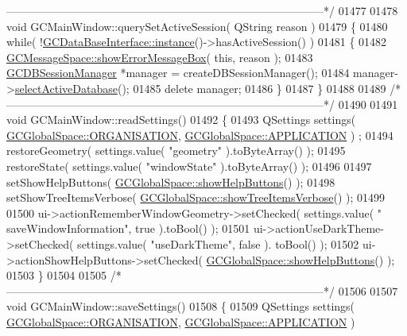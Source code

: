 \begin{DoxyCode}
{{{{{{{{      --------------------------------------------------------------------------------------*/}
01477 
01478 \textcolor{keywordtype}{void} GCMainWindow::querySetActiveSession( QString reason )
01479 \{
01480   \textcolor{keywordflow}{while}( !\hyperlink{class_g_c_data_base_interface_a1baea9c0667aa8b610ec30076fcab84c}{GCDataBaseInterface::instance}()->hasActiveSession() )
01481   \{
01482     \hyperlink{namespace_g_c_message_space_ab118b3a133686167617eb955029fd44e}{GCMessageSpace::showErrorMessageBox}( \textcolor{keyword}{this}, reason );
01483     \hyperlink{class_g_c_d_b_session_manager}{GCDBSessionManager} *manager = createDBSessionManager();
01484     manager->\hyperlink{class_g_c_d_b_session_manager_ac4e5a25619ee77bc9307d3428bfd345d}{selectActiveDatabase}();
01485     \textcolor{keyword}{delete} manager;
01486   \}
01487 \}
01488 
01489 \textcolor{comment}{/*
      --------------------------------------------------------------------------------------*/}
01490 
01491 \textcolor{keywordtype}{void} GCMainWindow::readSettings()
01492 \{
01493   QSettings settings( \hyperlink{namespace_g_c_global_space_a97583835f9987b1c94ff05802ccfe42f}{GCGlobalSpace::ORGANISATION}, \hyperlink{namespace_g_c_global_space_ab53b9c3447f00f1cc45a1d3fdfbba564}{GCGlobalSpace::APPLICATION} )
      ;
01494   restoreGeometry( settings.value( \textcolor{stringliteral}{"geometry"} ).toByteArray() );
01495   restoreState( settings.value( \textcolor{stringliteral}{"windowState"} ).toByteArray() );
01496 
01497   setShowHelpButtons( \hyperlink{namespace_g_c_global_space_a981753e55f0f77f981f67ccb1ad4ecf1}{GCGlobalSpace::showHelpButtons}() );
01498   setShowTreeItemsVerbose( \hyperlink{namespace_g_c_global_space_ad9a35f311bda4dd28f5cf155c5efc818}{GCGlobalSpace::showTreeItemsVerbose}() );
01499 
01500   ui->actionRememberWindowGeometry->setChecked( settings.value( \textcolor{stringliteral}{"
      saveWindowInformation"}, \textcolor{keyword}{true} ).toBool() );
01501   ui->actionUseDarkTheme->setChecked( settings.value( \textcolor{stringliteral}{"useDarkTheme"}, \textcolor{keyword}{false} ).
      toBool() );
01502   ui->actionShowHelpButtons->setChecked( \hyperlink{namespace_g_c_global_space_a981753e55f0f77f981f67ccb1ad4ecf1}{GCGlobalSpace::showHelpButtons}() );
01503 \}
01504 
01505 \textcolor{comment}{/*
      --------------------------------------------------------------------------------------*/}
01506 
01507 \textcolor{keywordtype}{void} GCMainWindow::saveSettings()
01508 \{
01509   QSettings settings( \hyperlink{namespace_g_c_global_space_a97583835f9987b1c94ff05802ccfe42f}{GCGlobalSpace::ORGANISATION}, \hyperlink{namespace_g_c_global_space_ab53b9c3447f00f1cc45a1d3fdfbba564}{GCGlobalSpace::APPLICATION} )
}}}}}}}
\end{DoxyCode}

